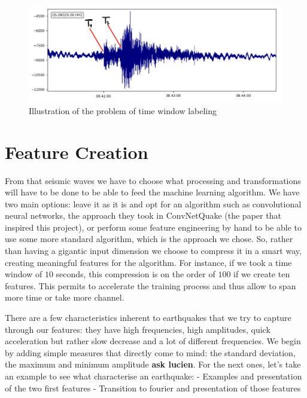 \documentclass[10pt,conference,compsocconf]{IEEEtran}
\begin{document}
\begin{figure}[h]
  \centering
	\includegraphics[width=\columnwidth]{problem-time-window-labeling.png}
  \caption{Illustration of the problem of time window labeling}
	\label{fig:problem-discretization}
\end{figure}

\section{Feature Creation}
From that seismic waves we have to choose what processing and transformations will have to be done to be able to feed the machine learning algorithm. We have two main options: leave it as it is and opt for an algorithm such as convolutional neural networks, the approach they took in ConvNetQuake (the paper \cite{ConvNetPaper} that inspired this project), or perform some feature engineering by hand to be able to use some more standard algorithm, which is the approach we chose. So, rather than having a gigantic input dimension we choose to compress it in a smart way, creating meaningful features for the algorithm. For instance, if we took a time window of $10$ seconds, this compression is on the order of $100$ if we create ten features. This permits to accelerate the training process and thus allow to span more time or take more channel.\newline

There are a few characteristics inherent to earthquakes that we try to capture through our features: they have high frequencies, high amplitudes, quick acceleration but rather slow decrease and a lot of different frequencies. We begin by adding simple measures that directly come to mind: the standard deviation, the maximum and minimum amplitude \textbf{ask lucien}. For the next ones, let's take an example to see what characterise an earthquake:\newline
- Examples and presentation of the two first features
- Transition to fourier and presentation of those features
\end{document}
